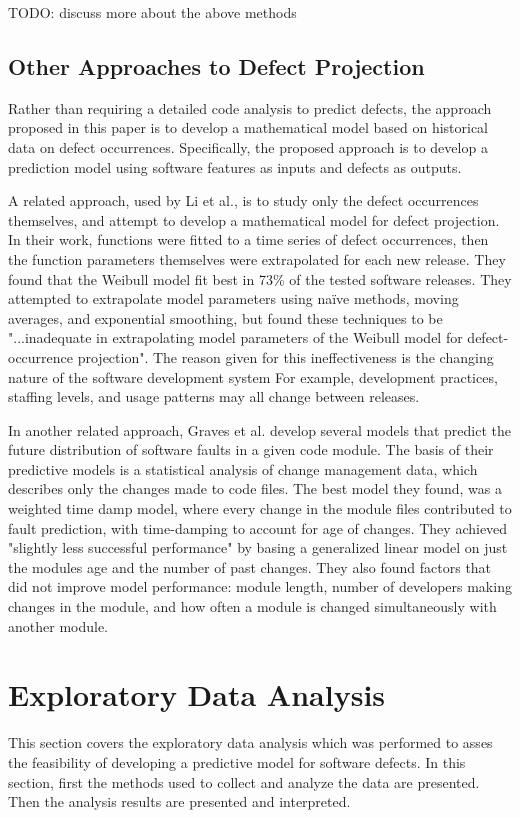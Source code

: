 \documentclass[a4paper]{scrartcl}
\begin{document}
TODO: discuss more about the above methods

\subsection{Other Approaches to Defect Projection}
Rather than requiring a detailed code analysis to predict defects, the approach proposed in this paper is to develop a mathematical model based on historical data on defect occurrences. Specifically, the proposed approach is to develop a prediction model using software features as inputs and defects as outputs.

A related approach, used by Li et al.\cite{2004_li_emperical_eval}, is to study only the defect occurrences themselves, and attempt to develop a mathematical model for defect projection. In their work, functions were fitted to a time series of defect occurrences, then the function parameters themselves were extrapolated for each new release. They found that the Weibull model fit best in 73\% of the tested software releases. They attempted to extrapolate model parameters using naïve methods, moving averages, and exponential smoothing, but found these techniques to be "...inadequate in extrapolating model parameters of the Weibull model for defect-occurrence projection". The reason given for this ineffectiveness is the changing nature of the software development system For example, development practices, staffing levels, and usage patterns may all change between releases.

In another related approach, Graves et al.\cite{2000_graves_predicting} develop several models that predict the future distribution of software faults in a given code module. The basis of their predictive models is a statistical analysis of change management data, which describes only the changes made to code files. The best model they found, was a weighted time damp model, where every change in the module files contributed to fault prediction, with time-damping to account for age of changes. They achieved "slightly less successful performance" by basing a generalized linear model on just the modules age and the number of past changes. They also found factors that did not improve model performance: module length, number of developers making changes in the module, and how often a module is changed simultaneously with another module.

\section{Exploratory Data Analysis}
\label{sec:exploratory}
This section covers the exploratory data analysis which was performed to asses the feasibility of developing a predictive model for software defects. In this section, first the methods used to collect and analyze the data are presented. Then the analysis results are presented and interpreted.
\end{document}
